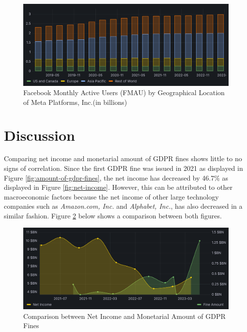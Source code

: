 \documentclass[12pt, a4paper]{article}
\begin{document}
\begin{figure}[H]
    \centering
    \includegraphics[width=1.00\textwidth]{facebook-mau}
    \caption{Facebook Monthly Active Users (FMAU) by Geographical Location of
    Meta Platforms, Inc.(in billions)\cite{2023q1,2021q2Slides,2019q4Slides}}
    \label{fig:facebook-mau}
\end{figure}

\section*{Discussion}




Comparing net income and monetarial amount of GDPR fines shows little to no
signs of correlation. Since the first GDPR fine was issued in 2021 as displayed
in Figure \ref{fig:amount-of-gdpr-fines}, the net income has decreased by 46.7\%
as displayed in Figure \ref{fig:net-income}. However, this can be attributed to
other macroeconomic factors because the net income of other large technology
companies such as \textit{Amazon.com, Inc.} and \textit{Alphabet, Inc.}, has
also decreased in a similar fashion\cite{amznNetIncome,googleNetIncome}. Figure
\ref{fig:rel-fines-net-income} below shows a comparison between both figures.

\begin{figure}[H]
    \centering
    \includegraphics[width=1.00\textwidth]{rel-fines-net-income}
    \caption{Comparison between Net Income and Monetarial Amount of GDPR Fines}
    \label{fig:rel-fines-net-income}
\end{figure}
\end{document}
